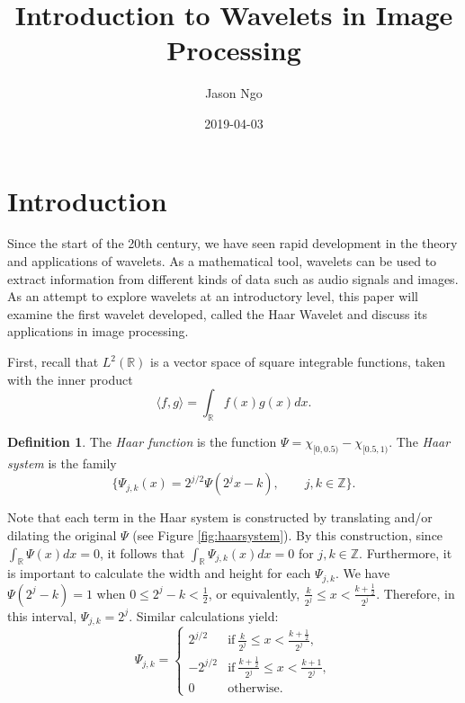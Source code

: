 \documentclass[11pt]{amsart}
\title{Introduction to Wavelets in Image Processing}
\author{Jason Ngo}
\date{2019-04-03}
\theoremstyle{theorem} %
\theoremstyle{definition}
\newtheorem{defn}[thm]{Definition}
\theoremstyle{example}
\theoremstyle{remark}
\numberwithin{equation}{section}
\newcommand{\R}{\mathbb{R}}
\newcommand{\Z}{\mathbb{Z}}
\begin{document}
\maketitle

\section{Introduction}
Since the start of the 20th century, we have seen rapid development in the theory and applications of wavelets. As a mathematical tool, wavelets can be used to extract information from different kinds of data such as audio signals and images. As an attempt to explore wavelets at an introductory level, this paper will examine the first wavelet developed, called the Haar Wavelet and discuss its applications in image processing.

\vspace{8pt}
First, recall that \emph{$ L^2(\R) $} is a vector space of square integrable functions, taken with the inner product
\[ \langle f,g \rangle = \int_{\R} f(x) g(x)  dx. \]

\begin{defn} \label{haar}
	The \emph{Haar function} is the function $ \varPsi = \chi_{[0,0.5)} - \chi_{[0.5,1)} $. The \emph{Haar system} is the family
	\[ \{ \varPsi_{j,k}(x) = 2^{j/2} \varPsi (2^j x-k), \qquad j,k \in \Z \}. \]
\end{defn}

	Note that each term in the Haar system is constructed by translating and/or dilating the original $ \varPsi $ (see Figure \ref{fig:haarsystem}). By this construction, since $ \int_{\R} \varPsi(x)dx = 0 $, it follows that $ \int_{\R} \varPsi_{j,k}(x)dx = 0 $ for $ j,k \in \Z $.
	Furthermore, it is important to calculate the width and height for each $ \varPsi_{j,k} $. We have $ \varPsi(2^j - k) = 1 $ when $ 0 \leq 2^j - k < \frac{1}{2} $, or equivalently, $ \frac{k}{2^j} \leq x < \frac{k+\frac{1}{2}}{2^j} $. Therefore, in this interval, $ \varPsi_{j,k} = 2^j $. Similar calculations yield:
	\begin{equation} \label{eq:height}
		\varPsi_{j,k} = 
		\begin{cases}
		2^{j/2} &\text{if}\ \frac{k}{2^j} \leq x < \frac{k+\frac{1}{2}}{2^j}, \\
		-2^{j/2} &\text{if}\ \frac{k+\frac{1}{2}}{2^j} \leq x < \frac{k+1}{2^j}, \\
		0 &\text{otherwise}.
		\end{cases}
	\end{equation}
\end{document}

